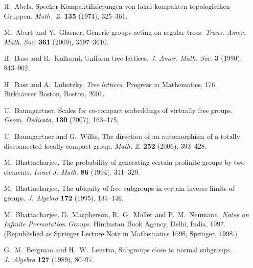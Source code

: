 \documentclass{emsprocart}
\theoremstyle{definition}
\begin{document}
\frenchspacing
\begin{thebibliography}{99}

  H.\ Abels,
                Specker-Kompaktifizierungen von lokal kompakten
                topologischen Gruppen.
                {\em Math.\ Z.} {\bf 135} (1974), 325--361.

 M.~Abert and Y.~Glasner,
             Generic groups acting on regular trees.
             {\em Trans. Amer. Math. Soc.} {\bf 361} (2009), 3597--3610.

                H.~Bass and R.~Kulkarni,
                Uniform tree lattices.
                {\em J. Amer. Math. Soc.} {\bf 3} (1990), 843--902.

 H.~Bass and A.~Lubotzky,
               {\em Tree lattices}.
               Progress in Mathematics, 176. Birkh\"auser Boston,
               Boston, 2001.

  U.~Baumgartner,
                Scales for co-compact embeddings of virtually free
                groups.
                {\em Geom. Dedicata}, {\bf 130}  (2007), 163--175.

  U.~Baumgartner and G.~Willis,
                The direction of an automorphism of a totally
                disconnected locally compact group.
                {\em  Math. Z.} {\bf 252}  (2006),  393--428.

  M.~Bhattacharjee,
                 The probability of generating certain profinite groups by
                 two elements.
                 {\em Israel J. Math.} {\bf 86} (1994),  311--329.

   M.~Bhattacharjee,
               The ubiquity of free subgroups in certain inverse limits
               of groups.
               {\em J. Algebra}  {\bf 172}  (1995), 134--146.

    M.\ Bhattacharjee, D.\ Macpherson, R.\ G.\
                M{\"o}ller and P.\ M.\ Neumann,
                {\em Notes on Infinite Permutation Groups}.
                Hindustan Book Agency, Delhi, India, 1997.
                (Republished  as Springer Lecture Note
                in Mathematics 1698, Springer, 1998.)

 G.\ M.\ Bergman and H.\ W.\ Lenstra,
                Subgroups close to normal subgroups.
                {\em J.\ Algebra} {\bf 127} (1989), 80--97.


\end{thebibliography}
\end{document}
